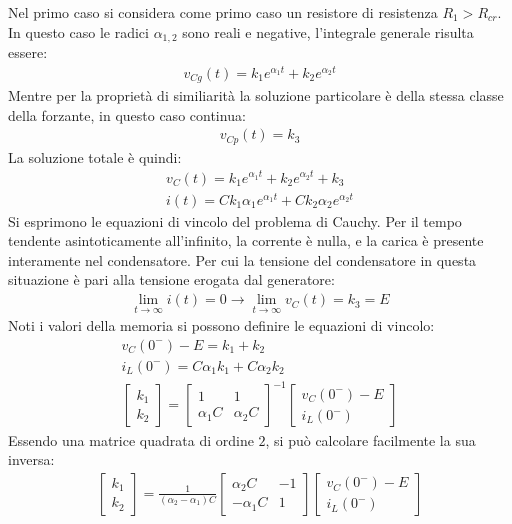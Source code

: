 \documentclass{article}
\numberwithin{equation}{subsection}
\begin{document}
Nel primo caso si considera come primo caso un resistore di resistenza $R_1>R_{cr}$. In questo caso le radici $\alpha_{1,2}$ sono reali e negative, l'integrale generale 
risulta essere:
\begin{gather*}
    v_{Cg}(t)=k_1e^{\alpha_1t}+k_2e^{\alpha_2t}
\end{gather*}
Mentre per la proprietà di similiarità la soluzione particolare è della stessa classe della forzante, in questo caso continua:
\begin{gather*}
    v_{Cp}(t)=k_3
\end{gather*}
La soluzione totale è quindi:
\begin{gather*}
    v_C(t)=k_1e^{\alpha_1t}+k_2e^{\alpha_2t}+k_3\\
    i(t)=Ck_1\alpha_1e^{\alpha_1t}+Ck_2\alpha_2e^{\alpha_2t}
\end{gather*}
Si esprimono le equazioni di vincolo del problema di Cauchy. Per il tempo tendente asintoticamente all'infinito, la corrente è nulla, e la carica è presente interamente nel 
condensatore. Per cui la tensione del condensatore in questa situazione è pari alla tensione erogata dal generatore: 
\begin{gather*}
    \lim_{t\to\infty}i(t)=0\rightarrow \lim_{t\to\infty}v_C(t)=k_3=E
\end{gather*}
Noti i valori della memoria si possono definire le equazioni di vincolo:
\begin{gather*}
    v_C(0^-)-E=k_1+k_2\\
    i_L(0^-)=C\alpha_1k_1+C\alpha_2k_2\\
    \begin{bmatrix}
        k_1\\k_2
    \end{bmatrix}=\begin{bmatrix}
        1&1\\\alpha_1C&\alpha_2C
    \end{bmatrix}^{-1}\begin{bmatrix}
        v_C(0^-)-E\\i_L(0^-)
    \end{bmatrix}
\end{gather*}
Essendo una matrice quadrata di ordine $2$, si può calcolare facilmente la sua inversa:
\begin{gather*}
    \begin{bmatrix}
        k_1\\k_2
    \end{bmatrix}=\displaystyle\frac{1}{(\alpha_2-\alpha_1)C}\begin{bmatrix}
        \alpha_2C&-1\\-\alpha_1C&1
    \end{bmatrix}\begin{bmatrix}
        v_C(0^-)-E\\i_L(0^-)
    \end{bmatrix}
\end{gather*}
\end{document}
